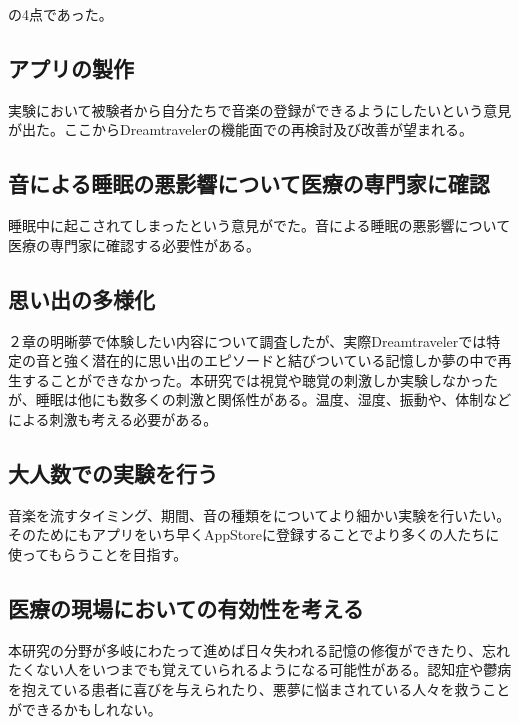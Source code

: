 の4点であった。

\subsection{アプリの製作}
実験において被験者から自分たちで音楽の登録ができるようにしたいという意見が出た。ここからDreamtravelerの機能面での再検討及び改善が望まれる。

\subsection{音による睡眠の悪影響について医療の専門家に確認}
睡眠中に起こされてしまったという意見がでた。音による睡眠の悪影響について医療の専門家に確認する必要性がある。

\subsection{思い出の多様化}
２章の明晰夢で体験したい内容について調査したが、実際Dreamtravelerでは特定の音と強く潜在的に思い出のエピソードと結びついている記憶しか夢の中で再生することができなかった。本研究では視覚や聴覚の刺激しか実験しなかったが、睡眠は他にも数多くの刺激と関係性がある。温度、湿度、振動や、体制などによる刺激も考える必要がある。

\subsection{大人数での実験を行う}
音楽を流すタイミング、期間、音の種類をについてより細かい実験を行いたい。そのためにもアプリをいち早くAppStoreに登録することでより多くの人たちに使ってもらうことを目指す。

\subsection{医療の現場においての有効性を考える}
本研究の分野が多岐にわたって進めば日々失われる記憶の修復ができたり、忘れたくない人をいつまでも覚えていられるようになる可能性がある。認知症や鬱病を抱えている患者に喜びを与えられたり、悪夢に悩まされている人々を救うことができるかもしれない。


